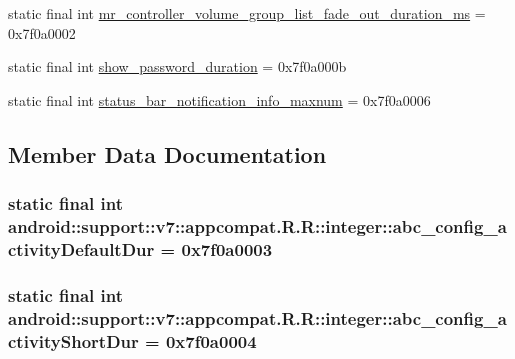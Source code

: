 \begin{CompactItemize}
\item 
static final int \hyperlink{classandroid_1_1support_1_1v7_1_1appcompat_1_1_r_1_1integer_63c6b7c19cf668ccacbd4b589283ef96}{mr\_\-controller\_\-volume\_\-group\_\-list\_\-fade\_\-out\_\-duration\_\-ms} = 0x7f0a0002
\item 
static final int \hyperlink{classandroid_1_1support_1_1v7_1_1appcompat_1_1_r_1_1integer_13473fc83ffcfaf1a80dd29544f8f4f2}{show\_\-password\_\-duration} = 0x7f0a000b
\item 
static final int \hyperlink{classandroid_1_1support_1_1v7_1_1appcompat_1_1_r_1_1integer_63da2e06b9c398514e5229d5230f605a}{status\_\-bar\_\-notification\_\-info\_\-maxnum} = 0x7f0a0006
\end{CompactItemize}


\subsection{Member Data Documentation}
\hypertarget{classandroid_1_1support_1_1v7_1_1appcompat_1_1_r_1_1integer_f3179c672ed6f17e5b76ba538b10bbd8}{
\subsubsection[{abc\_\-config\_\-activityDefaultDur}]{\setlength{\rightskip}{0pt plus 5cm}static final int android::support::v7::appcompat.R.R::integer::abc\_\-config\_\-activityDefaultDur = 0x7f0a0003}}
\label{classandroid_1_1support_1_1v7_1_1appcompat_1_1_r_1_1integer_f3179c672ed6f17e5b76ba538b10bbd8}


\hypertarget{classandroid_1_1support_1_1v7_1_1appcompat_1_1_r_1_1integer_199e1cf937411d1077fac8e1bf773821}{
\subsubsection[{abc\_\-config\_\-activityShortDur}]{\setlength{\rightskip}{0pt plus 5cm}static final int android::support::v7::appcompat.R.R::integer::abc\_\-config\_\-activityShortDur = 0x7f0a0004}}
\label{classandroid_1_1support_1_1v7_1_1appcompat_1_1_r_1_1integer_199e1cf937411d1077fac8e1bf773821}


